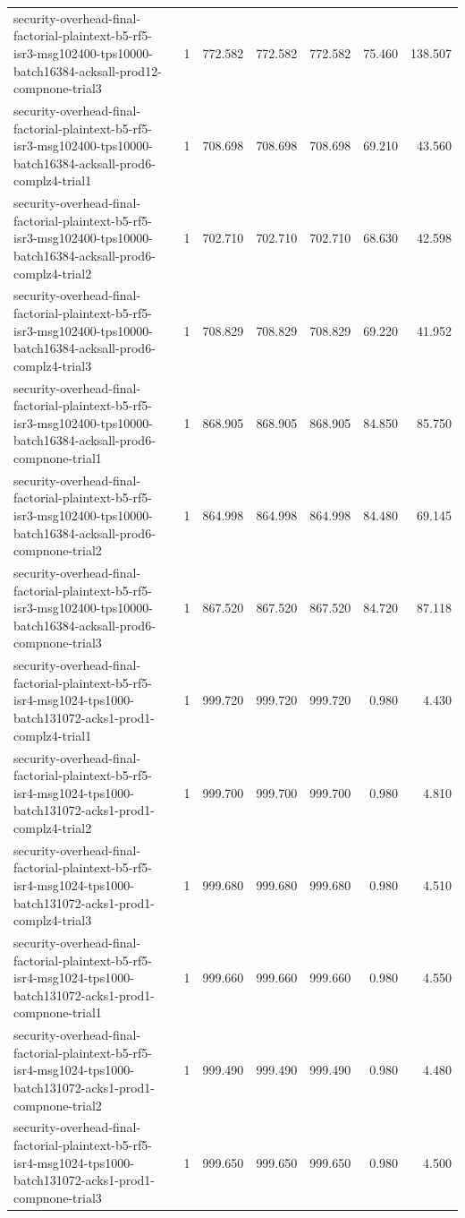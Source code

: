 \begin{tabular}{lrrrrrr}
security-overhead-final-factorial-plaintext-b5-rf5-isr3-msg102400-tps10000-batch16384-acksall-prod12-compnone-trial3 & 1 & 772.582 & 772.582 & 772.582 & 75.460 & 138.507 \\
security-overhead-final-factorial-plaintext-b5-rf5-isr3-msg102400-tps10000-batch16384-acksall-prod6-complz4-trial1 & 1 & 708.698 & 708.698 & 708.698 & 69.210 & 43.560 \\
security-overhead-final-factorial-plaintext-b5-rf5-isr3-msg102400-tps10000-batch16384-acksall-prod6-complz4-trial2 & 1 & 702.710 & 702.710 & 702.710 & 68.630 & 42.598 \\
security-overhead-final-factorial-plaintext-b5-rf5-isr3-msg102400-tps10000-batch16384-acksall-prod6-complz4-trial3 & 1 & 708.829 & 708.829 & 708.829 & 69.220 & 41.952 \\
security-overhead-final-factorial-plaintext-b5-rf5-isr3-msg102400-tps10000-batch16384-acksall-prod6-compnone-trial1 & 1 & 868.905 & 868.905 & 868.905 & 84.850 & 85.750 \\
security-overhead-final-factorial-plaintext-b5-rf5-isr3-msg102400-tps10000-batch16384-acksall-prod6-compnone-trial2 & 1 & 864.998 & 864.998 & 864.998 & 84.480 & 69.145 \\
security-overhead-final-factorial-plaintext-b5-rf5-isr3-msg102400-tps10000-batch16384-acksall-prod6-compnone-trial3 & 1 & 867.520 & 867.520 & 867.520 & 84.720 & 87.118 \\
security-overhead-final-factorial-plaintext-b5-rf5-isr4-msg1024-tps1000-batch131072-acks1-prod1-complz4-trial1 & 1 & 999.720 & 999.720 & 999.720 & 0.980 & 4.430 \\
security-overhead-final-factorial-plaintext-b5-rf5-isr4-msg1024-tps1000-batch131072-acks1-prod1-complz4-trial2 & 1 & 999.700 & 999.700 & 999.700 & 0.980 & 4.810 \\
security-overhead-final-factorial-plaintext-b5-rf5-isr4-msg1024-tps1000-batch131072-acks1-prod1-complz4-trial3 & 1 & 999.680 & 999.680 & 999.680 & 0.980 & 4.510 \\
security-overhead-final-factorial-plaintext-b5-rf5-isr4-msg1024-tps1000-batch131072-acks1-prod1-compnone-trial1 & 1 & 999.660 & 999.660 & 999.660 & 0.980 & 4.550 \\
security-overhead-final-factorial-plaintext-b5-rf5-isr4-msg1024-tps1000-batch131072-acks1-prod1-compnone-trial2 & 1 & 999.490 & 999.490 & 999.490 & 0.980 & 4.480 \\
security-overhead-final-factorial-plaintext-b5-rf5-isr4-msg1024-tps1000-batch131072-acks1-prod1-compnone-trial3 & 1 & 999.650 & 999.650 & 999.650 & 0.980 & 4.500 \\

\end{tabular}
